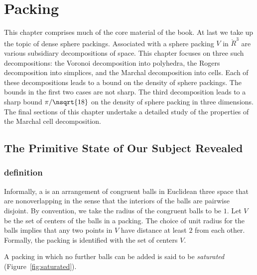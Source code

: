 
\chapter{Packing}

\begin{summary}
  This chapter comprises much of the core material of the book.  At
  last we take up the topic of dense sphere packings.  Associated with
  a sphere packing $V$ in $\ring{R}^3$ are various subsidiary
  decompositions of space.  This chapter focuses on three such
  decompositions: the Voronoi decomposition into polyhedra, the Rogers
  decomposition into simplices, and the Marchal decomposition into
  cells.  Each of these decompositions leads to a bound on the density
  of sphere packings.  The bounds in the first two cases are not
  sharp.  The third decomposition leads to a sharp bound
  $\pi/\nsqrt{18}$ on the density of sphere packing in three
  dimensions.  The final sections of this chapter undertake a detailed
  study of the properties of the Marchal cell decomposition.
\end{summary}

\section{The Primitive State of Our Subject Revealed}


\subsection{definition}



Informally, a  is an arrangement of congruent
balls in Euclidean three space that are nonoverlapping in the sense
that the interiors of the balls are pairwise disjoint.  By convention,
we take the radius of the congruent balls to be $1$.
Let $ V$ be the set of centers of the balls in a
packing. The choice of unit radius for the
balls implies that any two points in $ V$ have distance  at
least $2$ from each other. 
 Formally, the packing is identified
with the set of centers $V$.
%

%
A packing in which no further balls can be added is said to be {\it
saturated} (Figure~\ref{fig:saturated}).

